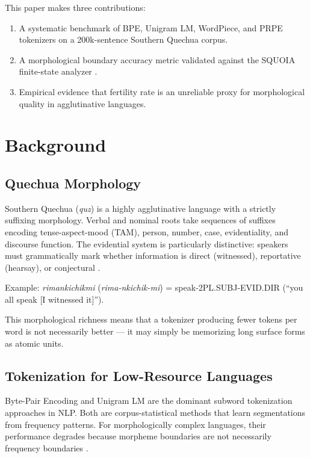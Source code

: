 \documentclass[11pt]{article}
\begin{document}
This paper makes three contributions:
\begin{enumerate}
    \item A systematic benchmark of BPE, Unigram LM, WordPiece, and PRPE tokenizers on a 200k-sentence Southern Quechua corpus.
    \item A morphological boundary accuracy metric validated against the SQUOIA finite-state analyzer \cite{rios2016}.
    \item Empirical evidence that fertility rate is an unreliable proxy for morphological quality in agglutinative languages.
\end{enumerate}

\section{Background}

\subsection{Quechua Morphology}

Southern Quechua (\textit{quz}) is a highly agglutinative language with a strictly suffixing morphology. Verbal and nominal roots take sequences of suffixes encoding tense-aspect-mood (TAM), person, number, case, evidentiality, and discourse function. The evidential system is particularly distinctive: speakers must grammatically mark whether information is direct (witnessed), reportative (hearsay), or conjectural \cite{faller2002}.

Example: \textit{rimankichikmi} (\textit{rima-nkichik-mi}) = speak-2PL.SUBJ-EVID.DIR (``you all speak [I witnessed it]'').

This morphological richness means that a tokenizer producing fewer tokens per word is not necessarily better --- it may simply be memorizing long surface forms as atomic units.

\subsection{Tokenization for Low-Resource Languages}

Byte-Pair Encoding \cite{sennrich2016} and Unigram LM \cite{kudo2018} are the dominant subword tokenization approaches in NLP. Both are corpus-statistical methods that learn segmentations from frequency patterns. For morphologically complex languages, their performance degrades because morpheme boundaries are not necessarily frequency boundaries \cite{rust2021}.
\end{document}
